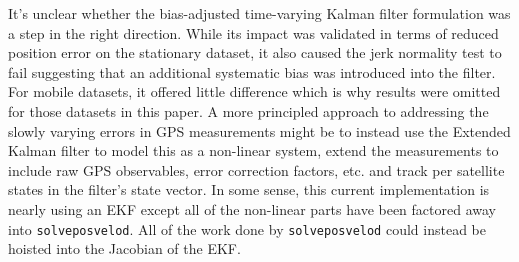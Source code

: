 It's unclear whether the bias-adjusted time-varying Kalman filter formulation was a step in the right direction.  While its impact was validated in terms of reduced position error on the stationary dataset, it also caused the jerk normality test to fail suggesting that an additional systematic bias was introduced into the filter.  For mobile datasets, it offered little difference which is why results were omitted for those datasets in this paper.  A more principled approach to addressing the slowly varying errors in GPS measurements might be to instead use the Extended Kalman filter to model this as a non-linear system, extend the measurements to include raw GPS observables, error correction factors, etc. and track per satellite states in the filter's state vector.  In some sense, this current implementation is nearly using an EKF except all of the non-linear parts have been factored away into \texttt{solveposvelod}.  All of the work done by \texttt{solveposvelod} could instead be hoisted into the Jacobian of the EKF. 
